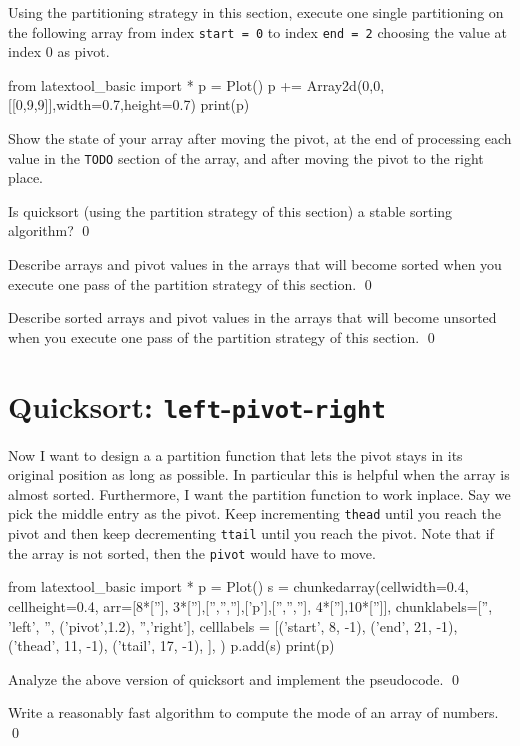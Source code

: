 \newpage
\begin{ex}
\begin{tightlist}
\item Using the partitioning strategy in this section,
execute one single partitioning on the following array
from index \verb!start = 0! to index \verb!end = 2!
choosing the value at index 0 as pivot.

\begin{python}
from latextool_basic import *
p = Plot()
p += Array2d(0,0,[[0,9,9]],width=0.7,height=0.7)
print(p)
\end{python}

Show the state of your array after moving the pivot, at the end of
processing each value in the \verb!TODO! section of the array,
and after moving the pivot to the right place.
\item Is quicksort (using the partition strategy of this section)
a stable sorting algorithm?
\qed
\end{tightlist}
\end{ex}


\newpage
\begin{ex}
Describe arrays and pivot values in the arrays that will become
sorted when you execute one pass of the partition strategy of this section.
\qed
\end{ex}


\newpage
\begin{ex}
Describe sorted arrays and pivot values in the arrays that will become
unsorted when you execute one pass of the partition strategy of this section.
\qed
\end{ex}


\newpage
\section{Quicksort: \texttt{left}-\texttt{pivot}-\texttt{right}}

Now I want to design a a partition function that lets the pivot
stays in its original position as long as possible.
In particular this is helpful when the array is almost sorted.
Furthermore, I want the partition function to work inplace.
Say we pick the middle entry as the pivot.
Keep incrementing \verb!thead! until you reach the pivot and then
keep decrementing \verb!ttail! until you reach the pivot.
Note that if the array is not sorted, then the \verb!pivot! would have to move.

\begin{python}
from latextool_basic import *
p = Plot()
s = chunkedarray(cellwidth=0.4, 
                 cellheight=0.4,
                 arr=[8*[''], 3*[''],['','',''],['p'],['','',''], 4*[''],10*['']],
                 chunklabels=['', 'left', '', ('pivot',1.2), '','right'],
                 celllabels = [('start', 8, -1),
                               ('end',   21, -1),
                               ('thead', 11, -1),
                               ('ttail', 17, -1),
                              ],
)
p.add(s)
print(p)
\end{python}

\begin{ex}
Analyze the above version of quicksort and implement the pseudocode.
\qed
\end{ex}

\begin{ex}
Write a reasonably fast algorithm to compute the mode of an array of 
numbers.
\qed
\end{ex}
